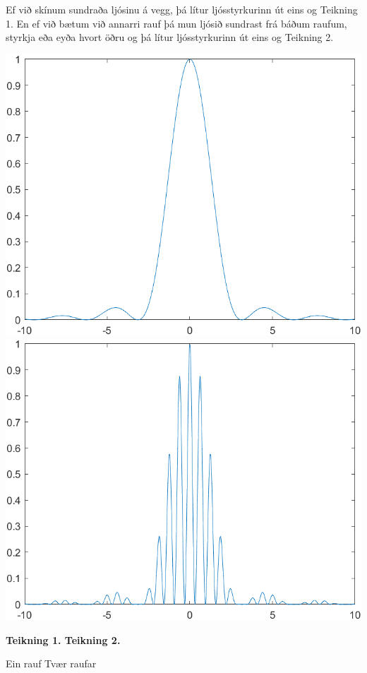 \documentclass[12pt]{article}
\begin{document}
Ef við skínum sundraða ljósinu á vegg, þá lítur ljósstyrkurinn út eins og Teikning 1. En ef við bætum við annarri rauf þá mun ljósið sundrast frá báðum raufum, styrkja eða eyða hvort öðru og þá lítur ljósstyrkurinn út eins og Teikning 2.

\begin{center}
    \includegraphics[scale=0.5]{html/teikning1.png}
    \includegraphics[scale=0.5]{html/teikning2.png}
    
    \bf Teikning 1.
    \qquad
    \qquad
    \qquad
    \qquad
    \bf Teikning 2.

    {\footnotesize Ein rauf}
    \qquad
    \qquad
    \qquad
    \qquad
    \quad
    {\footnotesize Tvær raufar}

\end{center}
\end{document}

